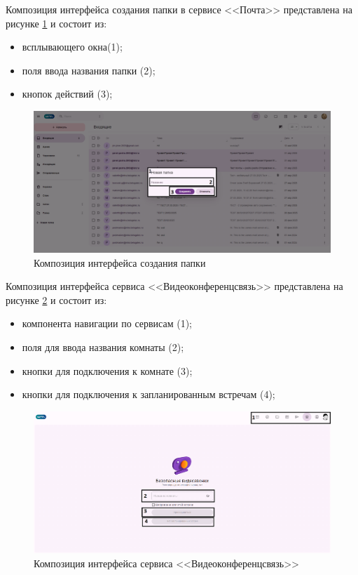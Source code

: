 Композиция интерфейса создания папки в сервисе <<Почта>> представлена на рисунке \ref{templ:image1d} и состоит из:
\begin{itemize}
  \item всплывающего окна(1);
  \item поля ввода названия папки (2);
  \item кнопок действий (3);
\end{itemize}
\begin{figure}[H]
	\centering
	\includegraphics[width=1\linewidth]{images/почта4}
	\caption{Композиция интерфейса создания папки}
	\label{templ:image1d}
\end{figure}

Композиция интерфейса сервиса <<Видеоконференцсвязь>> представлена на рисунке \ref{templ:image2} и состоит из:
\begin{itemize}
  \item компонента навигации по сервисам (1);
  \item поля для ввода названия комнаты (2);
  \item кнопки для подключения к комнате (3);
  \item кнопки для подключения к запланированным встречам (4);
\end{itemize}
\begin{figure}[H]
	\centering
	\includegraphics[width=1\linewidth]{images/вкс}
	\caption{Композиция интерфейса сервиса <<Видеоконференцсвязь>>}
	\label{templ:image2}
\end{figure}

